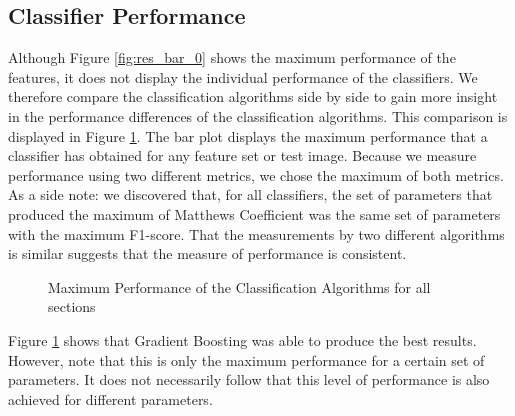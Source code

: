 \subsection{Classifier Performance}

Although Figure \ref{fig:res_bar_0} shows the maximum performance of the features, it does not display the individual performance of the classifiers. We therefore compare the classification algorithms side by side to gain more insight in the performance differences of the classification algorithms. This comparison is displayed in Figure \ref{fig:res_bar_1}. The bar plot displays the maximum performance that a classifier has obtained for any feature set or test image. Because we measure performance using two different metrics, we chose the maximum of both metrics. As a side note: we discovered that, for all classifiers, the set of parameters that produced the maximum of Matthews Coefficient was the same set of parameters with the maximum F1-score. That the measurements by two different algorithms is similar suggests that the measure of performance is consistent.

\dataone

\begin{figure}
	\caption{Maximum Performance of the Classification Algorithms for all sections}
	\label{fig:res_bar_1}
\end{figure}

Figure \ref{fig:res_bar_1} shows that Gradient Boosting was able to produce the best results. However, note that this is only the maximum performance for a certain set of parameters. It does not necessarily follow that this level of performance is also achieved for different parameters.

